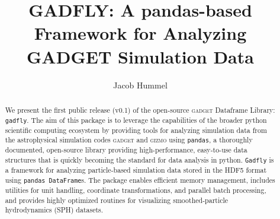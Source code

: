 \documentclass{emulateapj}
\newcommand{\code}[1]{\texttt{#1}}
\begin{document}

\title{GADFLY:  A pandas-based Framework for Analyzing GADGET Simulation Data}



\author{Jacob Hummel}





\begin{abstract}
We present the first public release (v0.1) of the open-source \textsc{gadget} Dataframe Library: \code{gadfly}.
The aim of this package is to leverage the capabilities of the broader python scientific computing ecosystem by providing tools for analyzing simulation data from the astrophysical simulation codes \textsc{gadget} and \textsc{gizmo} using \code{pandas}, a thoroughly documented, open-source library providing high-performance, easy-to-use data structures that is quickly becoming the standard for data analysis in python. 
\code{Gadfly} is a framework for analyzing particle-based simulation data stored in the HDF5 format using \code{pandas DataFrame}s. 
The package enables efficient memory management, includes utilities for unit handling, coordinate transformations, and parallel batch processing, and provides highly optimized routines for visualizing smoothed-particle hydrodynamics (SPH) datasets.
\end{abstract}
\end{document}
